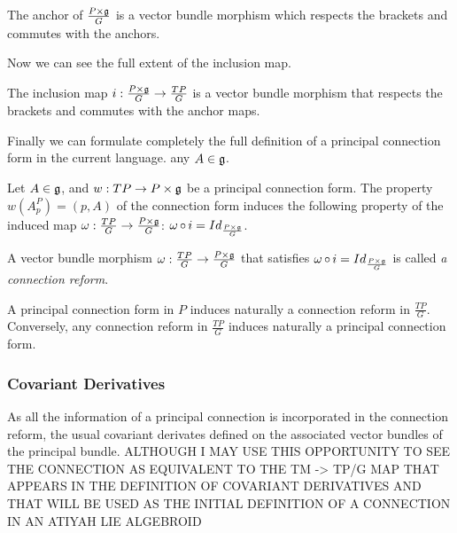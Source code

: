 \begin{proposition}
The anchor of $\frac{P \times \mathfrak{g}}{G}$ is a vector bundle morphism which respects the brackets and commutes with the anchors.
\end{proposition}

Now we can see the full extent of the inclusion map.

\begin{theorem}
The inclusion map $i:\frac{P \times \mathfrak{g}}{G} \to \frac{TP}{G}$ is a vector bundle morphism that respects the brackets and commutes with the anchor maps.
\end{theorem}

Finally we can formulate completely the full definition of a principal connection form in the current language. any $A \in \mathfrak{g}$.

\begin{proposition}
Let $A \in \mathfrak{g}$, and $w:TP \to P \times \mathfrak{g}$ be a principal connection form. The property $w(A^P_p) = (p, A)$ of the connection form induces the following property of the induced map $\omega:\frac{TP}{G} \to \frac{P \times \mathfrak{g}}{G}$: $\omega \operatorname{\circ} i = Id_{\frac{P \times \mathfrak{g}}{G}}$.
\end{proposition}

\begin{definition} 
A vector bundle morphism $\omega:\frac{TP}{G} \to \frac{P \times \mathfrak{g}}{G}$ that satisfies $\omega \operatorname{\circ} i = Id_{\frac{P \times \mathfrak{g}}{G}}$ is called \emph{a connection reform}.
\end{definition}


\begin{theorem}
A principal connection form in $P$ induces naturally a connection reform in $\frac{TP}{G}$. Conversely, any connection reform in $\frac{TP}{G}$ induces naturally a principal connection form.
\end{theorem}


\subsubsection{Covariant Derivatives}

As all the information of a principal connection is incorporated in the connection reform, the usual covariant derivates defined on the associated vector bundles of the principal bundle. ALTHOUGH I MAY USE THIS OPPORTUNITY TO SEE THE CONNECTION AS EQUIVALENT TO THE TM -> TP/G MAP THAT APPEARS IN THE DEFINITION OF COVARIANT DERIVATIVES AND THAT WILL BE USED AS THE INITIAL DEFINITION OF A CONNECTION IN AN ATIYAH LIE ALGEBROID


